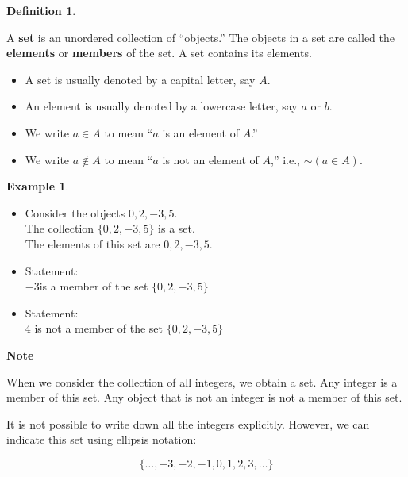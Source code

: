 \documentclass[
]{book}
\providecommand{\tightlist}{%
  \setlength{\itemsep}{0pt}\setlength{\parskip}{0pt}}
\theoremstyle{definition}
\newtheorem{definition}{Definition}[chapter]
\theoremstyle{definition}
\newtheorem{example}{Example}[chapter]
\theoremstyle{definition}
\theoremstyle{definition}
\theoremstyle{remark}
\begin{document}
\begin{definition}
\protect\hypertarget{def:unnamed-chunk-120}{}\label{def:unnamed-chunk-120}

A \textbf{set} is an unordered collection of ``objects.'' The objects in a set are called the \textbf{elements} or \textbf{members} of the set. A set contains its elements.

\begin{itemize}
\tightlist
\item
  A set is usually denoted by a capital letter, say \(A\).
\item
  An element is usually denoted by a lowercase letter, say \(a\) or \(b\).
\item
  We write \(a \in A\) to mean ``\(a\) is an element of \(A\).''
\item
  We write \(a \notin A\) to mean ``\(a\) is not an element of \(A\),'' i.e., \(\sim (a \in A)\).
\end{itemize}

\end{definition}

\begin{example}
\protect\hypertarget{exm:unnamed-chunk-121}{}\label{exm:unnamed-chunk-121}\leavevmode

\begin{itemize}
\item
  Consider the objects \(0, 2, -3, 5\).\\
  The collection \(\{0, 2, -3, 5\}\) is a set.\\
  The elements of this set are \(0, 2, -3, 5\).
\item
  Statement:\\
  \(-3\)is a member of the set \(\{0, 2, -3, 5\}\)
\item
  Statement:\\
  \(4\) is not a member of the set \(\{0, 2, -3, 5\}\)
\end{itemize}

\end{example}

\textbf{Note}

When we consider the collection of all integers, we obtain a set. Any integer is a member of this set. Any object that is not an integer is not a member of this set.

It is not possible to write down all the integers explicitly. However, we can indicate this set using ellipsis notation:

\[
\{\dots, -3, -2, -1, 0, 1, 2, 3, \dots\}
\]
\end{document}
